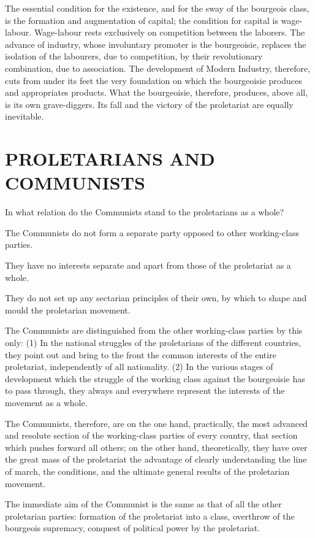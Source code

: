 \documentclass[, oneside]{article}   	%
\begin{document}
The essential condition for the existence, and for the sway of the bourgeois class, is the formation and augmentation of capital; the condition for capital is wage-labour. Wage-labour rests exclusively on competition between the laborers. The advance of industry, whose involuntary promoter is the bourgeoisie, replaces the isolation of the labourers, due to competition, by their revolutionary combination, due to association. The development of Modern Industry, therefore, cuts from under its feet the very foundation on which the bourgeoisie produces and appropriates products. What the bourgeoisie, therefore, produces, above all, is its own grave-diggers. Its fall and the victory of the proletariat are equally inevitable.

\section{PROLETARIANS AND COMMUNISTS}
In what relation do the Communists stand to the proletarians as a whole?

The Communists do not form a separate party opposed to other working-class parties.

They have no interests separate and apart from those of the proletariat as a whole.

They do not set up any sectarian principles of their own, by which to shape and mould the proletarian movement.

The Communists are distinguished from the other working-class parties by this only: (1) In the national struggles of the proletarians of the different countries, they point out and bring to the front the common interests of the entire proletariat, independently of all nationality. (2) In the various stages of development which the struggle of the working class against the bourgeoisie has to pass through, they always and everywhere represent the interests of the movement as a whole.

The Communists, therefore, are on the one hand, practically, the most advanced and resolute section of the working-class parties of every country, that section which pushes forward all others; on the other hand, theoretically, they have over the great mass of the proletariat the advantage of clearly understanding the line of march, the conditions, and the ultimate general results of the proletarian movement.

The immediate aim of the Communist is the same as that of all the other proletarian parties: formation of the proletariat into a class, overthrow of the bourgeois supremacy, conquest of political power by the proletariat.
\end{document}
